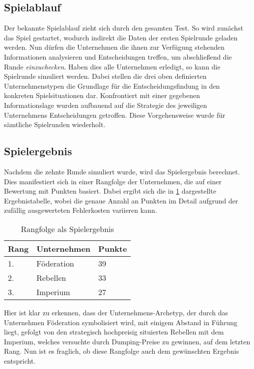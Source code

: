 \subsection{Spielablauf}
Der bekannte Spielablauf zieht sich durch den gesamten Test. So wird zunächst das Spiel gestartet, wodurch indirekt die Daten der ersten Spielrunde geladen werden. Nun dürfen die Unternehmen die ihnen zur Verfügung stehenden Informationen analysieren und Entscheidungen treffen, um abschließend die Runde \textit{einzuchecken}. Haben dies alle Unternehmen erledigt, so kann die Spielrunde simuliert werden. Dabei stellen die drei oben definierten Unternehmenstypen die Grundlage für die Entscheidungsfindung in den konkreten Spielsituationen dar. Konfrontiert mit einer gegebenen Informationslage wurden aufbauend auf die Strategie des jeweiligen Unternehmens Entscheidungen getroffen. Diese Vorgehensweise wurde für sämtliche Spielrunden wiederholt.

\subsection{Spielergebnis}
Nachdem die zehnte Runde simuliert wurde, wird das Spielergebnis berechnet. Dies manifestiert sich in einer Rangfolge der Unternehmen, die auf einer Bewertung mit Punkten basiert. Dabei ergibt sich die in \ref{tab:junit-spielablauf-ergebnis} dargestellte Ergebnistabelle, wobei die genaue Anzahl an Punkten im Detail aufgrund der zufällig ausgewerteten Fehlerkosten variieren kann.

\begin{table}[htb]
     \centering
     \begin{tabular}{ | l | l | l | }
          \hline
          Rang & Unternehmen & Punkte \\
          \hline \hline
          1. & Föderation & 39 \\ \hline
          2. & Rebellen & 33 \\ \hline
          3. & Imperium & 27 \\ \hline
     \end{tabular}
     \caption{Rangfolge als Spielergebnis}
     \label{tab:junit-spielablauf-ergebnis}
\end{table}

Hier ist klar zu erkennen, dass der Unternehmens-Archetyp, der durch das Unternehmen Föderation symbolisiert wird, mit einigem Abstand in Führung liegt, gefolgt von den strategisch hochpreisig situierten Rebellen mit dem Imperium, welches versuchte durch Dumping-Preise zu gewinnen, auf dem letzten Rang. Nun ist es fraglich, ob diese Rangfolge auch dem gewünschten Ergebnis entspricht.

